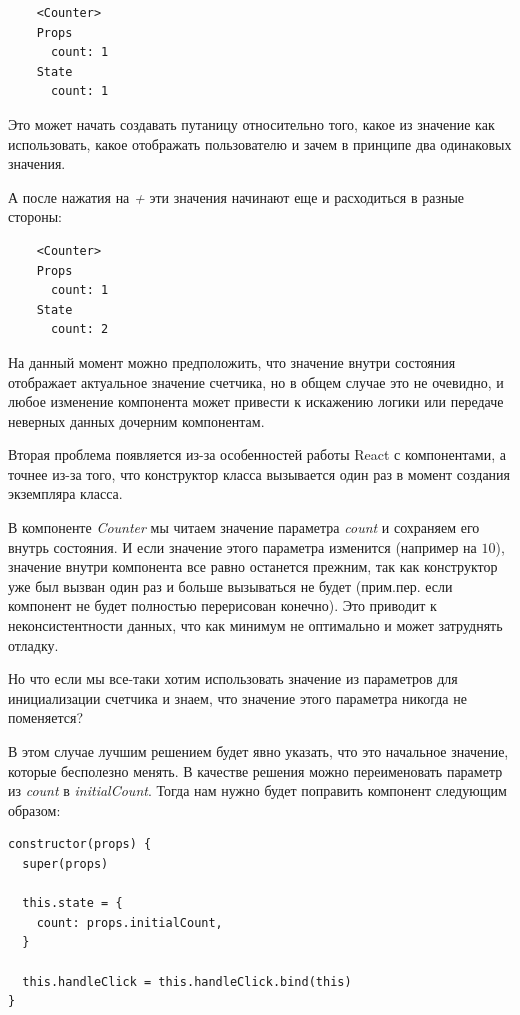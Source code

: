 \begin{lstlisting}
    <Counter>
    Props
      count: 1
    State
      count: 1
\end{lstlisting}

Это может начать создавать путаницу относительно того, какое из значение как использовать, какое отображать пользователю и зачем в принципе два одинаковых значения.

А после нажатия на \textit{+} эти значения начинают еще и расходиться в разные стороны:

\begin{lstlisting}
    <Counter>
    Props
      count: 1
    State
      count: 2
\end{lstlisting}

На данный момент можно предположить, что значение внутри состояния отображает актуальное значение счетчика, но в общем случае это не очевидно, и любое изменение компонента может привести к искажению логики или передаче неверных данных дочерним компонентам.

Вторая проблема появляется из-за особенностей работы React с компонентами, а точнее из-за того, что конструктор класса вызывается один раз в момент создания экземпляра класса.

В компоненте \textit{Counter} мы читаем значение параметра \textit{count} и сохраняем его внутрь состояния. И если значение этого параметра изменится (например на $10$), значение внутри компонента все равно останется прежним, так как конструктор уже был вызван один раз и больше вызываться не будет (прим.пер. если компонент не будет полностью перерисован конечно). Это приводит к неконсистентности данных, что как минимум не оптимально и может затруднять отладку.

Но что если мы все-таки хотим использовать значение из параметров для инициализации счетчика и знаем, что значение этого параметра никогда не поменяется?

В этом случае лучшим решением будет явно указать, что это начальное значение, которые бесполезно менять. В качестве решения можно переименовать параметр из \textit{count} в \textit{initialCount}. Тогда нам нужно будет поправить компонент следующим образом:

\begin{lstlisting}
constructor(props) {
  super(props)
  
  this.state = {
    count: props.initialCount,
  }
  
  this.handleClick = this.handleClick.bind(this)
}
\end{lstlisting}


